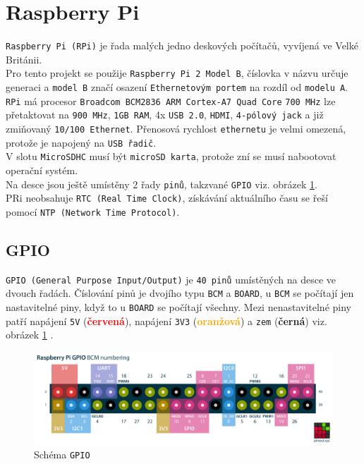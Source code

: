 \documentclass[czech,BP]{thesiskiv}
\begin{document}
	\section{Raspberry Pi}
		\texttt{Raspberry Pi (RPi)} je řada malých jedno deskových počítačů, vyvíjená ve Velké Británii.\\		
		Pro tento projekt se použije \texttt{Raspberry Pi 2 Model B}, číslovka v názvu určuje generaci a \texttt{model B} značí osazení \texttt{Ethernetovým portem} na rozdíl od \texttt{modelu A}.
		\texttt{RPi} má procesor \texttt{Broadcom BCM2836 ARM Cortex-A7 Quad Core} \texttt{700 MHz} lze přetaktovat na \texttt{900 MHz}, \texttt{1GB RAM}, 4x \texttt{USB 2.0}, \texttt{HDMI}, \texttt{4-pólový jack} a již zmiňovaný \texttt{10/100 Ethernet}. Přenosová rychlost \texttt{ethernetu} je velmi omezená, protože je napojený na \texttt{USB řadič}.\\
		V slotu \texttt{MicroSDHC} musí být \texttt{microSD karta}, protože zní se musí nabootovat operační systém.\\
		Na desce jsou ještě umístěny 2 řady \texttt{pinů}, takzvané \texttt{GPIO} viz. obrázek \ref{fig:gpio}.\\
		PRi neobsahuje \texttt{RTC (Real Time Clock)}, získávání aktuálního času se řeší pomocí \texttt{NTP (Network Time Protocol)}.
	

		\subsection{GPIO}
			\texttt{GPIO (General Purpose Input/Output)} je \texttt{40 pinů} umístěných na desce ve dvouch řadách. Číslování pinů je dvojího typu \texttt{BCM} a \texttt{BOARD}, u \texttt{BCM} se počítají jen nastavitelné piny, když to u \texttt{BOARD} se počítají všechny.
Mezi nenastavitelné piny patří napájení \texttt{5V} (\textcolor{red}{\textbf{červená}}), napájení \texttt{3V3} (\textcolor{orange}{\textbf{oranžová}}) a \texttt{zem} (\textbf{černá}) viz. obrázek \ref{fig:gpio} .	
		
		\begin{figure}[h]
   		 	\centering
			\includegraphics[width=1\textwidth]{../images/gpio.png}	
			\caption{Schéma \texttt{GPIO}}
    		\label{fig:gpio}
		\end{figure}		
		
\end{document}
